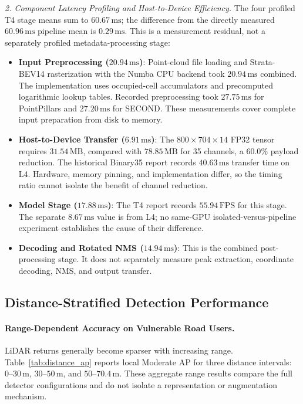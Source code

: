 \textit{2. Component Latency Profiling and Host-to-Device Efficiency.}
The four profiled T4 stage means sum to $60.67\,\text{ms}$; the difference from the directly measured $60.96\,\text{ms}$ pipeline mean is $0.29\,\text{ms}$. This is a measurement residual, not a separately profiled metadata-processing stage:
\begin{itemize}
    \item \textbf{Input Preprocessing ($20.94\,\text{ms}$)}: Point-cloud file loading and Strata-BEV14 rasterization with the Numba CPU backend took $20.94\,\text{ms}$ combined. The implementation uses occupied-cell accumulators and precomputed logarithmic lookup tables. Recorded preprocessing took $27.75\,\text{ms}$ for PointPillars and $27.20\,\text{ms}$ for SECOND. These measurements cover complete input preparation from disk to memory.
    \item \textbf{Host-to-Device Transfer ($6.91\,\text{ms}$)}: The $800\times704\times14$ FP32 tensor requires $31.54\,\text{MB}$, compared with $78.85\,\text{MB}$ for 35 channels, a $60.0\%$ payload reduction. The historical Binary35 report records $40.63\,\text{ms}$ transfer time on L4. Hardware, memory pinning, and implementation differ, so the timing ratio cannot isolate the benefit of channel reduction.
    \item \textbf{Model Stage ($17.88\,\text{ms}$)}: The T4 report records $55.94\,\text{FPS}$ for this stage. The separate $8.67\,\text{ms}$ value is from L4; no same-GPU isolated-versus-pipeline experiment establishes the cause of their difference.
    \item \textbf{Decoding and Rotated NMS ($14.94\,\text{ms}$)}: This is the combined post-processing stage. It does not separately measure peak extraction, coordinate decoding, NMS, and output transfer.
\end{itemize}


\subsection{Distance-Stratified Detection Performance}
\label{sec:distance_stratified}



\paragraph{Range-Dependent Accuracy on Vulnerable Road Users.}
LiDAR returns generally become sparser with increasing range. Table~\ref{tab:distance_ap} reports local Moderate AP for three distance intervals: $0\text{--}30\,\text{m}$, $30\text{--}50\,\text{m}$, and $50\text{--}70.4\,\text{m}$. These aggregate range results compare the full detector configurations and do not isolate a representation or augmentation mechanism.

